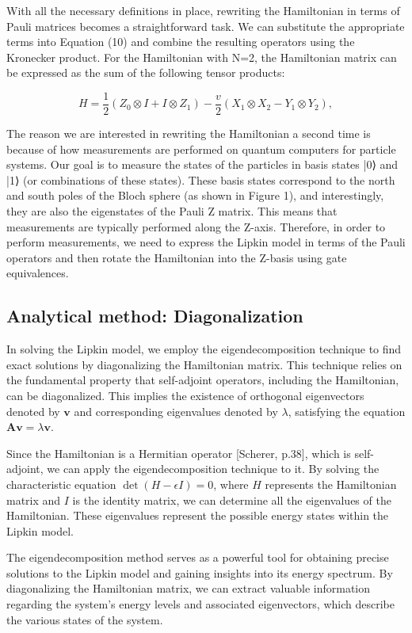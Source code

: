 \documentclass[onecolumn,10pt,cleanfoot]{asme2ej}
\begin{document}
With all the necessary definitions in place, rewriting the Hamiltonian in terms of Pauli matrices becomes a straightforward task. We can substitute the appropriate terms into Equation (10) and combine the resulting operators using the Kronecker product. For the Hamiltonian with N=2, the Hamiltonian matrix can be expressed as the sum of the following tensor products:

\begin{equation}
H = \frac{1}{2} (Z_0 \otimes I + I \otimes Z_1) - \frac{v}{2} (X_1 \otimes X_2 - Y_1 \otimes Y_2), 
\end{equation}


The reason we are interested in rewriting the Hamiltonian a second time is because of how measurements are performed on quantum computers for particle systems. Our goal is to measure the states of the particles in basis states |0⟩ and |1⟩ (or combinations of these states). These basis states correspond to the north and south poles of the Bloch sphere (as shown in Figure 1), and interestingly, they are also the eigenstates of the Pauli Z matrix. This means that measurements are typically performed along the Z-axis. Therefore, in order to perform measurements, we need to express the Lipkin model in terms of the Pauli operators and then rotate the Hamiltonian into the Z-basis using gate equivalences.

\subsection{Analytical method: Diagonalization}
In solving the Lipkin model, we employ the eigendecomposition technique to find exact solutions by diagonalizing the Hamiltonian matrix. This technique relies on the fundamental property that self-adjoint operators, including the Hamiltonian, can be diagonalized. This implies the existence of orthogonal eigenvectors denoted by $\mathbf{v}$ and corresponding eigenvalues denoted by $\lambda$, satisfying the equation $\mathbf{A} \mathbf{v} = \lambda \mathbf{v}$.

Since the Hamiltonian is a Hermitian operator [Scherer, p.38], which is self-adjoint, we can apply the eigendecomposition technique to it. By solving the characteristic equation $\det(H - \epsilon I) = 0$, where $H$ represents the Hamiltonian matrix and $I$ is the identity matrix, we can determine all the eigenvalues of the Hamiltonian. These eigenvalues represent the possible energy states within the Lipkin model.

The eigendecomposition method serves as a powerful tool for obtaining precise solutions to the Lipkin model and gaining insights into its energy spectrum. By diagonalizing the Hamiltonian matrix, we can extract valuable information regarding the system's energy levels and associated eigenvectors, which describe the various states of the system.
\end{document}
